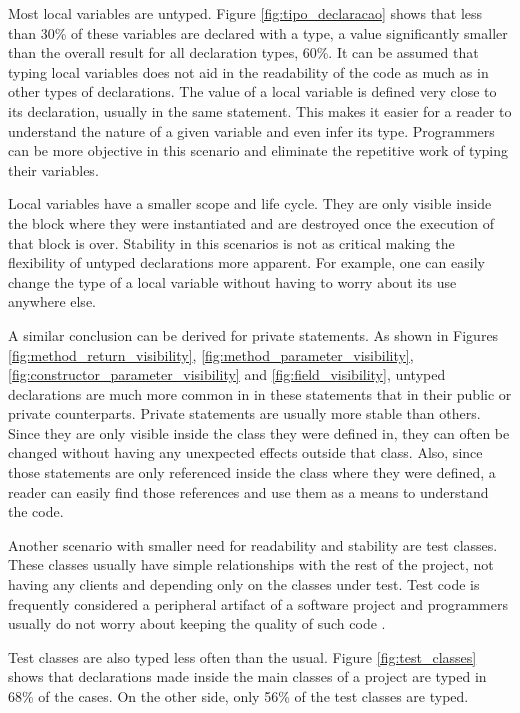 \documentclass[preprint]{sigplanconf}
\begin{document}
Most local variables are untyped.
Figure \ref{fig:tipo_declaracao} shows that less than 30\% of these variables are declared with a type, a value significantly smaller than the overall result for all declaration types, 60\%.
It can be assumed that typing local variables does not aid in the readability of the code as much as in other types of declarations.
The value of a local variable is defined very close to its declaration, usually in the same statement.
This makes it easier for a reader to understand the nature of a given variable and even infer its type.
Programmers can be more objective in this scenario and eliminate the repetitive work of typing their variables.

Local variables have a smaller scope and life cycle.
They are only visible inside the block where they were instantiated and are destroyed once the execution of that block is over.
Stability in this scenarios is not as critical making the flexibility of untyped declarations more apparent.
For example, one can easily change the type of a local variable without having to worry about its use anywhere else.

A similar conclusion can be derived for private statements.
As shown in Figures \ref{fig:method_return_visibility}, \ref{fig:method_parameter_visibility}, \ref{fig:constructor_parameter_visibility} and \ref{fig:field_visibility}, untyped declarations are much more common in in these statements that in their public or private counterparts.
Private statements are usually more stable than others.
Since they are only visible inside the class they were defined in, they can often be changed without having any unexpected effects outside that class.
Also, since those statements are only referenced inside the class where they were defined, a reader can easily find those references and use them as a means to understand the code.

Another scenario with smaller need for readability and stability are test classes.
These classes usually have simple relationships with the rest of the project, not having any clients and depending only on the classes under test.
Test code is frequently considered a peripheral artifact of a software project and programmers usually do not worry about keeping the quality of such code \cite{Meszaros07}.

Test classes are also typed less often than the usual.
Figure \ref{fig:test_classes} shows that declarations made inside the main classes of a project are typed in 68\% of the cases.
On the other side, only 56\% of the test classes are typed.
\end{document}
